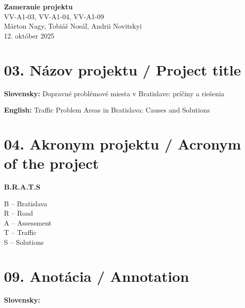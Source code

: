 \documentclass[12pt,a4paper]{article}
\begin{document}

\begin{center}
    {\LARGE \textbf{Zameranie projektu}} \\[0.5em]
    {\large VV-A1-03, VV-A1-04, VV-A1-09} \\[1.5em]
    {\large Márton Nagy, Tobiáš Nosáľ, Andrii Novitskyi} \\[0.5em]
    {\large 12. október 2025} \\[2em]
\end{center}

\section*{03. Názov projektu / Project title}

\textbf{Slovensky:} Dopravné problémové miesta v Bratislave: príčiny a riešenia

\noindent\textbf{English:} Traffic Problem Areas in Bratislava: Causes and Solutions

\vspace{1em}

\section*{04. Akronym projektu / Acronym of the project}

\textbf{B.R.A.T.S}

\noindent B – Bratislava \\
\noindent R – Road \\
\noindent A – Assessment \\
\noindent T – Traffic \\
\noindent S – Solutions

\vspace{1em}

\section*{09. Anotácia / Annotation}

\textbf{Slovensky:}
\end{document}
